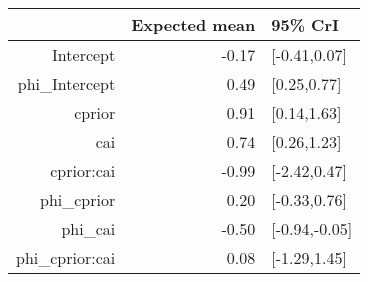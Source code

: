 \begin{tabular}{rrl}
  \hline
 & Expected mean & 95\% CrI \\ 
  \hline
Intercept & -0.17 & [-0.41,0.07] \\ 
  phi\_Intercept & 0.49 & [0.25,0.77] \\ 
  cprior & 0.91 & [0.14,1.63] \\ 
  cai & 0.74 & [0.26,1.23] \\ 
  cprior:cai & -0.99 & [-2.42,0.47] \\ 
  phi\_cprior & 0.20 & [-0.33,0.76] \\ 
  phi\_cai & -0.50 & [-0.94,-0.05] \\ 
  phi\_cprior:cai & 0.08 & [-1.29,1.45] \\ 
   \hline
\end{tabular}

